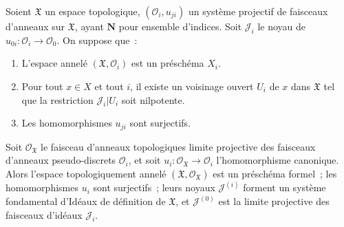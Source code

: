 \begin{proposition}[10.6.3]
\label{I.10.6.3-fr}
Soient $\mathfrak{X}$ un espace topologique,
$(\mathscr{O}_i,u_{ji})$ un système projectif de faisceaux d'anneaux sur
$\mathfrak{X}$, ayant $\mathbf{N}$ pour ensemble d'indices. Soit
$\mathscr{J}_i$ le noyau de
$u_{0i}:\mathscr{O}_i\to\mathscr{O}_0$. On suppose que~:
\begin{enumerate}
  \item[\textup{a)}] L'espace annelé $(\mathfrak{X},\mathscr{O}_i)$ est un
    préschéma $X_i$.
  \item[\textup{b)}] Pour tout $x\in X$ et tout $i$, il existe un voisinage
    ouvert $U_i$ de $x$ dans $\mathfrak{X}$ tel que la restriction
    $\mathscr{J}_i|U_i$ soit nilpotente.
  \item[\textup{c)}] Les homomorphismes $u_{ji}$ sont surjectifs.
\end{enumerate}


Soit $\mathscr{O}_{\mathfrak{X}}$ le faisceau d'anneaux topologiques
limite projective des faisceaux d'anneaux pseudo-discrets
$\mathscr{O}_i$, et soit
$u_i:\mathscr{O}_{\mathfrak{X}}\to\mathscr{O}_i$ l'homomorphisme
canonique. Alors l'espace topologiquement annelé
$(\mathfrak{X},\mathscr{O}_{\mathfrak{X}})$ est un préschéma formel~;
les homomorphismes $u_i$ sont surjectifs~; leurs noyaux
$\mathscr{J}^{(i)}$ forment un système fondamental d'Idéaux de définition
de $\mathfrak{X}$, et $\mathscr{J}^{(0)}$ est la limite projective des
faisceaux d'idéaux $\mathscr{J}_i$.
\end{proposition}

